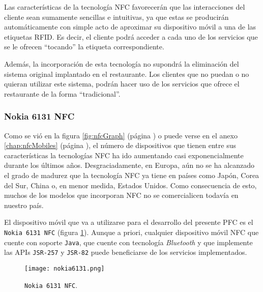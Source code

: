 Las características de la tecnología \acs{NFC} favorecerán que las 
interacciones del cliente sean sumamente sencillas e intuitivas, ya que estas 
se producirán automáticamente con simple acto de aproximar su dispositivo 
móvil a una de las etiquetas \acs{RFID}. Es decir, el cliente podrá acceder
a cada uno de los servicios que se le ofrecen ``tocando'' la etiqueta
correspondiente.

Además, la incorporación de esta tecnología no supondrá la eliminación del
sistema original implantado en el restaurante. Los clientes que no puedan
o no quieran utilizar este sistema, podrán hacer uso de los servicios que 
ofrece el restaurante de la forma ``tradicional''.

    \subsubsection{Nokia 6131 \acs{NFC}}
Como se vió en la figura \ref{fig:nfcGraph} (página
\pageref{fig:nfcGraph}) o puede verse en el anexo \ref{chap:nfcMobiles} (página
\pageref{chap:nfcMobiles}), el número de dispositivos que tienen entre sus 
características la tecnologías \acs{NFC} ha ido aumentando casi 
exponencialmente durante los últimos años. Desgraciadamente, en Europa, aún 
no se ha alcanzado el grado de madurez que la tecnología \acs{NFC} ya tiene 
en países como Japón, Corea del Sur, China o, en menor medida, Estados 
Unidos. Como consecuencia de esto, muchos de los modelos que incorporan
\acs{NFC} no se comercialicen todavía en nuestro país.

El dispositivo móvil que va a utilizarse para el desarrollo del presente
\acs{PFC} es el \texttt{Nokia 6131 \acs{NFC}} (figura \ref{fig:nokia6131}). 
Aunque a priori, cualquier dispositivo móvil \acs{NFC} que cuente con soporte 
\texttt{Java}, que cuente con tecnología \emph{Bluetooth} y que implemente las 
\acs{API}s \texttt{\acs{JSR}-257} y \texttt{\acs{JSR}-82} puede beneficiarse 
de los servicios implementados.

\begin{figure}[!h]
  \begin{center}
    \texttt{[image: nokia6131.png]}
    \caption{\texttt{Nokia 6131 \acs{NFC}}.}
    \label{fig:nokia6131}
  \end{center}
\end{figure}

